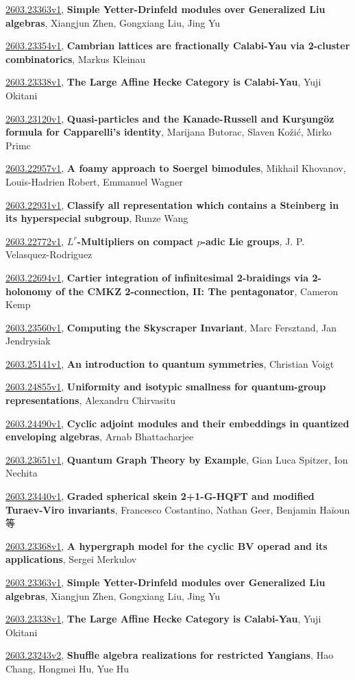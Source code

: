\documentclass[9pt, a4paper]{article}
\theoremstyle{plain}
\theoremstyle{definition}
\theoremstyle{remark}
\newcommand{\arxiv}[3]{\href{https://arxiv.org/abs/#1}{#1}, \textbf{\textcolor{arxivblue}{#2}}, #3}
\begin{document}
\arxiv{2603.23363v1}{Simple Yetter-Drinfeld modules over Generalized Liu algebras}{Xiangjun Zhen, Gongxiang Liu, Jing Yu}

\arxiv{2603.23354v1}{Cambrian lattices are fractionally Calabi-Yau via 2-cluster combinatorics}{Markus Kleinau}

\arxiv{2603.23338v1}{The Large Affine Hecke Category is Calabi-Yau}{Yuji Okitani}

\arxiv{2603.23120v1}{Quasi-particles and the Kanade-Russell and Kurşungöz formula for Capparelli's identity}{Marijana Butorac, Slaven Kožić, Mirko Primc}

\arxiv{2603.22957v1}{A foamy approach to Soergel bimodules}{Mikhail Khovanov, Louis-Hadrien Robert, Emmanuel Wagner}

\arxiv{2603.22931v1}{Classify all representation which contains a Steinberg in its hyperspecial subgroup}{Runze Wang}

\arxiv{2603.22772v1}{$L^r$-Multipliers on compact $p$-adic Lie groups}{J. P. Velasquez-Rodriguez}

\arxiv{2603.22694v1}{Cartier integration of infinitesimal 2-braidings via 2-holonomy of the CMKZ 2-connection, II: The pentagonator}{Cameron Kemp}

\arxiv{2603.23560v1}{Computing the Skyscraper Invariant}{Marc Fersztand, Jan Jendrysiak}

\arxiv{2603.25141v1}{An introduction to quantum symmetries}{Christian Voigt}

\arxiv{2603.24855v1}{Uniformity and isotypic smallness for quantum-group representations}{Alexandru Chirvasitu}

\arxiv{2603.24490v1}{Cyclic adjoint modules and their embeddings in quantized enveloping algebras}{Arnab Bhattacharjee}

\arxiv{2603.23651v1}{Quantum Graph Theory by Example}{Gian Luca Spitzer, Ion Nechita}

\arxiv{2603.23440v1}{Graded spherical skein 2+1-G-HQFT and modified Turaev-Viro invariants}{Francesco Costantino, Nathan Geer, Benjamin Haïoun 等}

\arxiv{2603.23368v1}{A hypergraph model for the cyclic BV operad and its applications}{Sergei Merkulov}

\arxiv{2603.23363v1}{Simple Yetter-Drinfeld modules over Generalized Liu algebras}{Xiangjun Zhen, Gongxiang Liu, Jing Yu}

\arxiv{2603.23338v1}{The Large Affine Hecke Category is Calabi-Yau}{Yuji Okitani}

\arxiv{2603.23243v2}{Shuffle algebra realizations for restricted Yangians}{Hao Chang, Hongmei Hu, Yue Hu}
\end{document}
